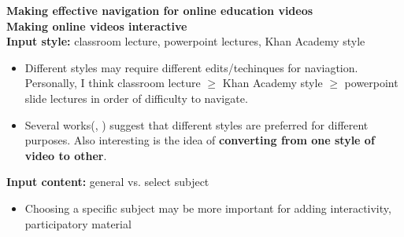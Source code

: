 \documentclass{report}
\begin{document}
\noindent\textbf{Making effective navigation for online education videos}\\
\textbf{Making online videos interactive}\\

\textbf{Input style:} classroom lecture, powerpoint lectures, Khan Academy style
\begin{itemize}
\item Different styles may require different edits/techinques for naviagtion. Personally, I think classroom lecture $\geq$ Khan Academy style $\geq$ powerpoint slide lectures in order of difficulty to navigate. 
\item Several works(\cite{Cross2013}, \cite{Cross2014}) suggest that different styles are preferred for different purposes. Also interesting is the idea of \textbf{converting from one style of video to other}.
\end{itemize}

\textbf{Input content:} general vs. select subject 
\begin{itemize}
\item Choosing a specific subject may be more important for adding interactivity, participatory material
\end{itemize}
\end{document}
